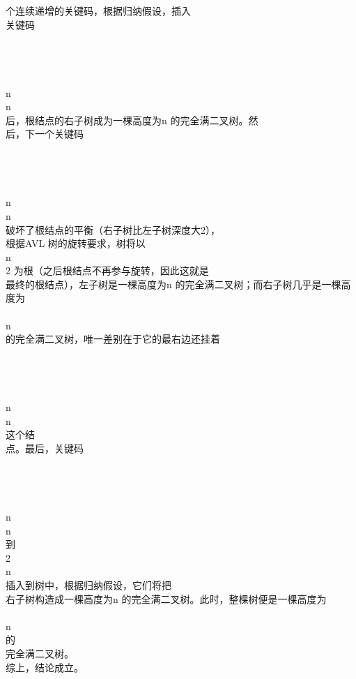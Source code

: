\begin{question}
\begin{solution}
个连续递增的关键码，根据归纳假设，插入\\
关键码\\
\\
\\
\\
\\
n\\
n\\
后，根结点的右子树成为一棵高度为n 的完全满二叉树。然\\
后，下一个关键码\\
\\
\\
\\
\\
n\\
n\\
破坏了根结点的平衡（右子树比左子树深度大2），\\
根据AVL 树的旋转要求，树将以\\
n\\
2 为根（之后根结点不再参与旋转，因此这就是\\
最终的根结点），左子树是一棵高度为n 的完全满二叉树；而右子树几乎是一棵高\\
度为\\
\\
n\\
的完全满二叉树，唯一差别在于它的最右边还挂着\\
\\
\\
\\
\\
n\\
n\\
这个结\\
点。最后，关键码\\
\\
\\
\\
\\
n\\
n\\
到\\
2 \\
n\\
插入到树中，根据归纳假设，它们将把\\
右子树构造成一棵高度为n 的完全满二叉树。此时，整棵树便是一棵高度为\\
\\
n\\
的\\
完全满二叉树。\\
综上，结论成立。\\

\end{solution}
\end{question}
